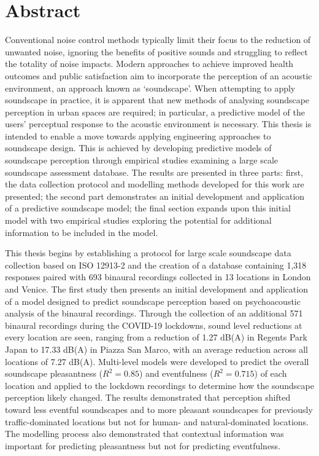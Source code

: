 \documentclass[twoside,fontsize=11pt,titlepage,chapterprefix=true
]{scrbook}
\begin{document}
\chapter*{Abstract}
Conventional noise control methods typically limit their focus to the reduction of unwanted noise, ignoring the benefits of positive sounds and struggling to reflect the totality of noise impacts. Modern approaches to achieve improved health outcomes and public satisfaction aim to incorporate the perception of an acoustic environment, an approach known as `soundscape'. When attempting to apply soundscape in practice, it is apparent that new methods of analysing soundscape perception in urban spaces are required; in particular, a predictive model of the users' perceptual response to the acoustic environment is necessary. This thesis is intended to enable a move towards applying engineering approaches to soundscape design. This is achieved by developing predictive models of soundscape perception through empirical studies examining a large scale soundscape assessment database. The results are presented in three parts: first, the data collection protocol and modelling methods developed for this work are presented; the second part demonstrates an initial development and application of a predictive soundscape model; the final section expands upon this initial model with two empirical studies exploring the potential for additional information to be included in the model.

This thesis begins by establishing a protocol for large scale soundscape data collection based on ISO 12913-2 and the creation of a database containing 1,318 responses paired with 693 binaural recordings collected in 13 locations in London and Venice. The first study then presents an initial development and application of a model designed to predict soundscape perception based on psychoacoustic analysis of the binaural recordings. Through the collection of an additional 571 binaural recordings during the COVID-19 lockdowns, sound level reductions at every location are seen, ranging from a reduction of 1.27 dB(A) in Regents Park Japan to 17.33 dB(A) in Piazza San Marco, with an average reduction across all locations of 7.27 dB(A). Multi-level models were developed to predict the overall soundscape pleasantness ($R^2=0.85$) and eventfulness ($R^2=0.715$) of each location and applied to the lockdown recordings to determine how the soundscape perception likely changed. The results demonstrated that perception shifted toward less eventful soundscapes and to more pleasant soundscapes for previously traffic-dominated locations but not for human- and natural-dominated locations. The modelling process also demonstrated that contextual information was important for predicting pleasantness but not for predicting eventfulness.
\end{document}
